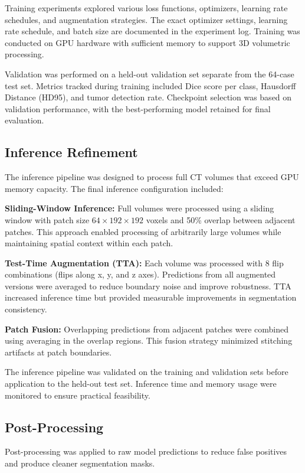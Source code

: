 Training experiments explored various loss functions, optimizers, learning rate schedules, and augmentation strategies. The exact optimizer settings, learning rate schedule, and batch size are documented in the experiment log. Training was conducted on GPU hardware with sufficient memory to support 3D volumetric processing.

Validation was performed on a held-out validation set separate from the 64-case test set. Metrics tracked during training included Dice score per class, Hausdorff Distance (HD95), and tumor detection rate. Checkpoint selection was based on validation performance, with the best-performing model retained for final evaluation.

\subsection{Inference Refinement}

The inference pipeline was designed to process full CT volumes that exceed GPU memory capacity. The final inference configuration included:

\textbf{Sliding-Window Inference:} Full volumes were processed using a sliding window with patch size $64 \times 192 \times 192$ voxels and 50\% overlap between adjacent patches. This approach enabled processing of arbitrarily large volumes while maintaining spatial context within each patch.

\textbf{Test-Time Augmentation (TTA):} Each volume was processed with 8 flip combinations (flips along x, y, and z axes). Predictions from all augmented versions were averaged to reduce boundary noise and improve robustness. TTA increased inference time but provided measurable improvements in segmentation consistency.

\textbf{Patch Fusion:} Overlapping predictions from adjacent patches were combined using averaging in the overlap regions. This fusion strategy minimized stitching artifacts at patch boundaries.

The inference pipeline was validated on the training and validation sets before application to the held-out test set. Inference time and memory usage were monitored to ensure practical feasibility.

\subsection{Post-Processing}

Post-processing was applied to raw model predictions to reduce false positives and produce cleaner segmentation masks.

